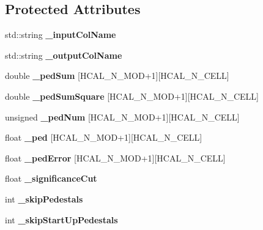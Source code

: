 \subsection*{Protected Attributes}
\begin{DoxyCompactItemize}
\item 
std\-::string {\bfseries \-\_\-input\-Col\-Name}\label{classCALICE_1_1PedestalOnTheFlyProcessor_a715f7012132a51ed82c00b9e500980aa}

\item 
std\-::string {\bfseries \-\_\-output\-Col\-Name}\label{classCALICE_1_1PedestalOnTheFlyProcessor_aa4bc9785a48b64ce13a93b087b74cd67}

\item 
double {\bfseries \-\_\-ped\-Sum} [H\-C\-A\-L\-\_\-\-N\-\_\-\-M\-O\-D+1][H\-C\-A\-L\-\_\-\-N\-\_\-\-C\-E\-L\-L]\label{classCALICE_1_1PedestalOnTheFlyProcessor_a82b074fc1d3fe2bdc109b85ea8ff703e}

\item 
double {\bfseries \-\_\-ped\-Sum\-Square} [H\-C\-A\-L\-\_\-\-N\-\_\-\-M\-O\-D+1][H\-C\-A\-L\-\_\-\-N\-\_\-\-C\-E\-L\-L]\label{classCALICE_1_1PedestalOnTheFlyProcessor_abde1f46084ba80f3a20c28b41398cfc1}

\item 
unsigned {\bfseries \-\_\-ped\-Num} [H\-C\-A\-L\-\_\-\-N\-\_\-\-M\-O\-D+1][H\-C\-A\-L\-\_\-\-N\-\_\-\-C\-E\-L\-L]\label{classCALICE_1_1PedestalOnTheFlyProcessor_a3e73753bc10884fa72f30cf89c4d98d1}

\item 
float {\bfseries \-\_\-ped} [H\-C\-A\-L\-\_\-\-N\-\_\-\-M\-O\-D+1][H\-C\-A\-L\-\_\-\-N\-\_\-\-C\-E\-L\-L]\label{classCALICE_1_1PedestalOnTheFlyProcessor_a40378847dcd7aff4c79795eb3fceee41}

\item 
float {\bfseries \-\_\-ped\-Error} [H\-C\-A\-L\-\_\-\-N\-\_\-\-M\-O\-D+1][H\-C\-A\-L\-\_\-\-N\-\_\-\-C\-E\-L\-L]\label{classCALICE_1_1PedestalOnTheFlyProcessor_ad4a27e50c47ca620894a12248958ddb3}

\item 
float {\bfseries \-\_\-significance\-Cut}\label{classCALICE_1_1PedestalOnTheFlyProcessor_a5776cfb8ca374fbcee4f3ca87bcf9297}

\item 
int {\bfseries \-\_\-skip\-Pedestals}\label{classCALICE_1_1PedestalOnTheFlyProcessor_a3528d68a6e0a2465c8550f8da410d44b}

\item 
int {\bfseries \-\_\-skip\-Start\-Up\-Pedestals}\label{classCALICE_1_1PedestalOnTheFlyProcessor_abdf7d6fec744c128abcaeb987d0ccb50}


\end{DoxyCompactItemize}
